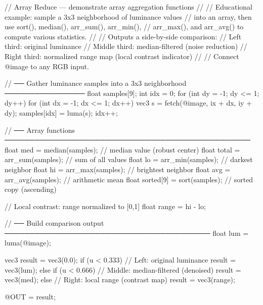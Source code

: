 // Array Reduce — demonstrate array aggregation functions
//
// Educational example: sample a 3x3 neighborhood of luminance values
// into an array, then use sort(), median(), arr_sum(), arr_min(),
// arr_max(), and arr_avg() to compute various statistics.
//
// Outputs a side-by-side comparison:
//   Left third:   original luminance
//   Middle third:  median-filtered (noise reduction)
//   Right third:   normalized range map (local contrast indicator)
//
// Connect @image to any RGB input.

// ── Gather luminance samples into a 3x3 neighborhood ────────────────
float samples[9];
int idx = 0;
for (int dy = -1; dy <= 1; dy++) {
    for (int dx = -1; dx <= 1; dx++) {
        vec3 s = fetch(@image, ix + dx, iy + dy);
        samples[idx] = luma(s);
        idx++;
    }
}

// ── Array functions ─────────────────────────────────────────────────
float med   = median(samples);       // median value (robust center)
float total = arr_sum(samples);      // sum of all values
float lo    = arr_min(samples);      // darkest neighbor
float hi    = arr_max(samples);      // brightest neighbor
float avg   = arr_avg(samples);      // arithmetic mean
float sorted[9] = sort(samples);     // sorted copy (ascending)

// Local contrast: range normalized to [0,1]
float range = hi - lo;

// ── Build comparison output ─────────────────────────────────────────
float lum = luma(@image);

vec3 result = vec3(0.0);
if (u < 0.333) {
    // Left: original luminance
    result = vec3(lum);
} else if (u < 0.666) {
    // Middle: median-filtered (denoised)
    result = vec3(med);
} else {
    // Right: local range (contrast map)
    result = vec3(range);
}

@OUT = result;
